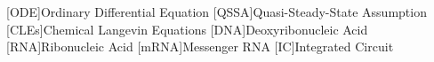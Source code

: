 \begin{acronym}

  [ODE]{Ordinary Differential Equation}
  [QSSA]{Quasi-Steady-State Assumption}
  [CLEs]{Chemical Langevin Equations}
  [DNA]{Deoxyribonucleic Acid}
  [RNA]{Ribonucleic Acid}
  [mRNA]{Messenger RNA}
  [IC]{Integrated Circuit}

\end{acronym}
